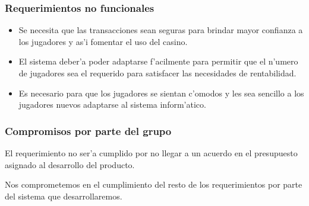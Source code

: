 \subsubsection{Requerimientos no funcionales}

\begin{itemize}

\item {} 

 Se necesita que las transacciones sean seguras para brindar mayor confianza a los jugadores y as'i fomentar el uso del casino.

\item  {}

 El sistema deber'a poder adaptarse f'acilmente para permitir que el n'umero de jugadores sea el requerido para satisfacer las necesidades de rentabilidad.

\item  {}

 Es necesario para que los jugadores se sientan c'omodos y les sea sencillo a los jugadores nuevos adaptarse al sistema inform'atico.

\end{itemize}


\subsubsection{Compromisos por parte del grupo}

El requerimiento  no ser'a cumplido por no llegar a un acuerdo en el presupuesto asignado al desarrollo del producto.

Nos comprometemos en el cumplimiento del resto de los requerimientos por parte del sistema que desarrollaremos.
